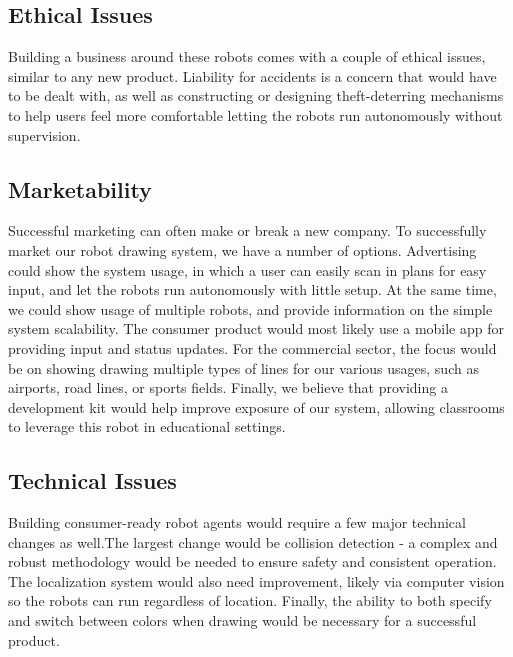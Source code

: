 \subsection{Ethical Issues}
Building a business around these robots comes with a couple of ethical issues, similar to any new product. Liability for accidents is a concern that would have to be dealt with, as well as constructing or designing theft-deterring mechanisms to help users feel more comfortable letting the robots run autonomously without supervision.

\subsection{Marketability}
Successful marketing can often make or break a new company. To successfully market our robot drawing system, we have a number of options. Advertising could show the system usage, in which a user can easily scan in plans for easy input, and let the robots run autonomously with little setup. At the same time, we could show usage of multiple robots, and provide information on the simple system scalability. The consumer product would most likely use a mobile app for providing input and status updates. For the commercial sector, the focus would be on showing drawing multiple types of lines for our various usages, such as airports, road lines, or sports fields. Finally, we believe that providing a development kit would help improve exposure of our system, allowing classrooms to leverage this robot in educational settings. 

\subsection{Technical Issues}
Building consumer-ready robot agents would require a few major technical changes as well.The largest change would be collision detection - a complex and robust methodology would be needed to ensure safety and consistent operation. The localization system would also need improvement, likely via computer vision so the robots can run regardless of location. Finally, the ability to both specify and switch between colors when drawing would be necessary for a successful product.
